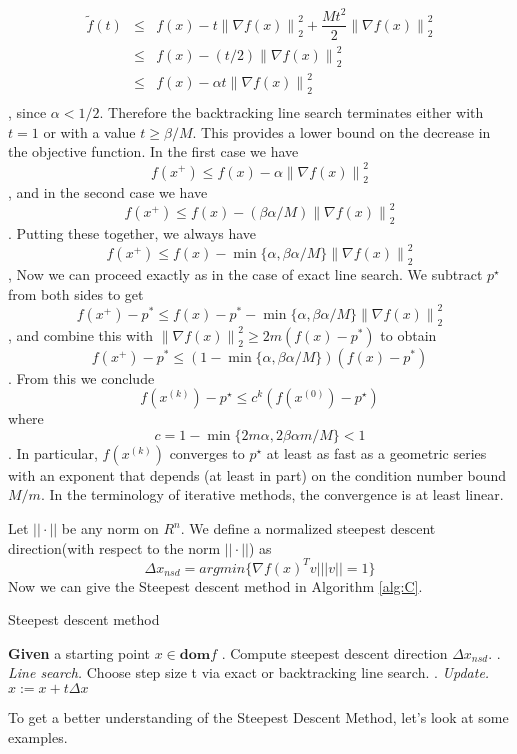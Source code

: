 \documentclass{acm_proc_article-sp}
\begin{document}
\begin{equation}
    \begin{array}{rcl}
        \widetilde{f}(t) & \leq & f(x)− t\left\| \nabla f\left( x\right) \right\| _{2}^{2} + \dfrac{Mt^{2}}{2}\left\| \nabla f\left( x\right) \right\| _{2}^{2} \\
        & \leq & f(x) - (t/2)\left\| \nabla f\left( x\right) \right\| _{2}^{2}\\
        & \leq & f(x) - \alpha t\left\| \nabla f\left( x\right) \right\| _{2}^{2}\\
    \end{array}
\end{equation},
since $\alpha < 1/2$. Therefore the backtracking line search terminates either with $t = 1$ or with a value $t \geq \beta/M$.
This provides a lower bound on the decrease in the objective function. 
In the first case we have
$$f(x^{+}) \leq f(x) − \alpha \left\| \nabla f\left( x\right) \right\| _{2}^{2}$$, 
and in the second case we have
$$f(x^{+}) \leq f(x) − (\beta\alpha /M) \left\| \nabla f\left( x\right) \right\| _{2}^{2}$$. 
Putting these together, we always have
$$f(x^{+}) \leq f(x) − \min\{\alpha, \beta\alpha /M\} \left\| \nabla f\left( x\right) \right\| _{2}^{2}$$, 
Now we can proceed exactly as in the case of exact line search. We subtract $p^{⋆}$ from both sides to get
$$f(x^{+})-p^{*} \leq f(x)-p^{*} − \min\{\alpha, \beta\alpha /M\} \left\| \nabla f\left( x\right) \right\| _{2}^{2}$$, 
and combine this with $\left\| \nabla f\left( x\right) \right\| _{2}^{2} \geq 2m(f(x)-p^{*})$ to obtain
$$f(x^{+})-p^{*} \leq (1 − \min\{\alpha, \beta\alpha /M\})(f(x)-p^{*})$$. 
From this we conclude
$$f(x^{(k)}) − p^{⋆} \leq c^{k}(f(x^{(0)}) − p^{⋆})$$
where
$$c = 1 - \min\{2m\alpha , 2\beta \alpha m/M\} < 1$$.
In particular, $f (x^{(k)})$ converges to $p^{⋆}$ at least as fast as a geometric series with an
exponent that depends (at least in part) on the condition number bound $M/m$. In
the terminology of iterative methods, the convergence is at least linear.

Let $||\cdot||$ be any norm on $R^n$. We define a normalized steepest descent direction(with respect to the norm $||\cdot||$) as
\begin{displaymath}
\Delta x _{nsd} = argmin\{ \nabla f(x)^Tv| ||v|| = 1\}
\end{displaymath}
Now we can give the Steepest descent method in Algorithm \ref{alg:C}.
\begin{algorithm}\caption{\label{alg:C}Steepest descent method}
\begin{algorithmic}
\STATE \textbf{Given} a starting point $x \in \textbf{dom} f$
\REPEAT
{}. Compute steepest descent direction $\Delta x _{nsd}$.
. \textit{Line search.} Choose step size t via exact or backtracking line search.
. \textit{Update.} $x:=x+t\Delta x$
\end{algorithmic}
\end{algorithm}
To get a better understanding of the Steepest Descent Method, let's look at some examples.
\end{document}
